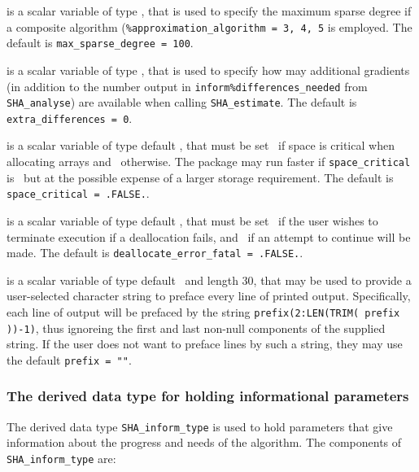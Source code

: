 \documentclass{galahad}
\newcommand{\packagename}{SHA}
\begin{document}
\begin{description}
 is a scalar variable of type \integer, 
that is used to specify the maximum sparse degree if a composite algorithm
({\tt \%approximation\_algorithm = 3, 4, 5} is employed.
The default is {\tt max\_sparse\_degree = 100}.

 is a scalar variable of type \integer, 
that is used to specify how may additional gradients (in addition to the number
output in {\tt inform\%differences\_needed} from {\tt \packagename\_\-analyse})
are available when calling {\tt \packagename\_\-estimate}.
The default is {\tt extra\_differences = 0}.

 is a scalar variable of type default \logical, 
that must be set \true\ if space is critical when allocating arrays
and  \false\ otherwise. The package may run faster if 
{\tt space\_critical} is \false\ but at the possible expense of a larger
storage requirement. The default is {\tt space\_critical = .FALSE.}.

 is a scalar variable of type default \logical, 
that must be set \true\ if the user wishes to terminate execution if
a deallocation  fails, and \false\ if an attempt to continue
will be made. The default is {\tt deallocate\_error\_fatal = .FALSE.}.

 is a scalar variable of type default \character\
and length 30, that may be used to provide a user-selected 
character string to preface every line of printed output. 
Specifically, each line of output will be prefaced by the string 
{\tt prefix(2:LEN(TRIM( prefix ))-1)},
thus ignoreing the first and last non-null components of the
supplied string. If the user does not want to preface lines by such
a string, they may use the default {\tt prefix = ""}.

\end{description}


\subsubsection{The derived data type for holding informational
 parameters}\label{typeinform}
The derived data type 
{\tt \packagename\_inform\_type} 
is used to hold parameters that give information about the progress and needs 
of the algorithm. The components of 
{\tt \packagename\_inform\_type} 
are:
\end{document}
